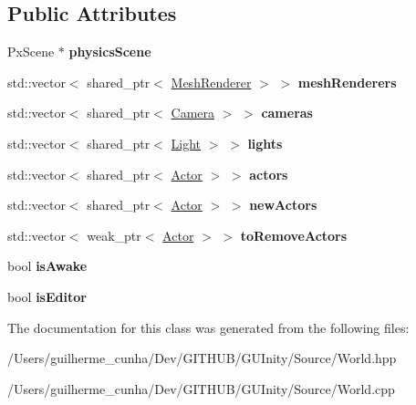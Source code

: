\subsection*{Public Attributes}
\begin{DoxyCompactItemize}
\item 
\hypertarget{class_world_a1cc1afd61b245eaa62eac90fdc629ee9}{}Px\+Scene $\ast$ {\bfseries physics\+Scene}\label{class_world_a1cc1afd61b245eaa62eac90fdc629ee9}

\item 
\hypertarget{class_world_aeb47e6e9190a33f623b63135045c339b}{}std\+::vector$<$ shared\+\_\+ptr$<$ \hyperlink{class_mesh_renderer}{Mesh\+Renderer} $>$ $>$ {\bfseries mesh\+Renderers}\label{class_world_aeb47e6e9190a33f623b63135045c339b}

\item 
\hypertarget{class_world_aff74fed56b77cb89f8a27f5dd8140f48}{}std\+::vector$<$ shared\+\_\+ptr$<$ \hyperlink{class_camera}{Camera} $>$ $>$ {\bfseries cameras}\label{class_world_aff74fed56b77cb89f8a27f5dd8140f48}

\item 
\hypertarget{class_world_a9cfccbc5ffd60f6d76e129f081274d31}{}std\+::vector$<$ shared\+\_\+ptr$<$ \hyperlink{class_light}{Light} $>$ $>$ {\bfseries lights}\label{class_world_a9cfccbc5ffd60f6d76e129f081274d31}

\item 
\hypertarget{class_world_aeeb78216c074d5af93306b3fefcab7f2}{}std\+::vector$<$ shared\+\_\+ptr$<$ \hyperlink{class_actor}{Actor} $>$ $>$ {\bfseries actors}\label{class_world_aeeb78216c074d5af93306b3fefcab7f2}

\item 
\hypertarget{class_world_a3a0f876c1f003e0fbfce30da0f18d730}{}std\+::vector$<$ shared\+\_\+ptr$<$ \hyperlink{class_actor}{Actor} $>$ $>$ {\bfseries new\+Actors}\label{class_world_a3a0f876c1f003e0fbfce30da0f18d730}

\item 
\hypertarget{class_world_a123122330f53df3868a97f5cef2f0704}{}std\+::vector$<$ weak\+\_\+ptr$<$ \hyperlink{class_actor}{Actor} $>$ $>$ {\bfseries to\+Remove\+Actors}\label{class_world_a123122330f53df3868a97f5cef2f0704}

\item 
\hypertarget{class_world_ad192f3af680a25132906f54f931766f5}{}bool {\bfseries is\+Awake}\label{class_world_ad192f3af680a25132906f54f931766f5}

\item 
\hypertarget{class_world_a9b29e4d9918c4eb24bc8f0fc940687eb}{}bool {\bfseries is\+Editor}\label{class_world_a9b29e4d9918c4eb24bc8f0fc940687eb}

\end{DoxyCompactItemize}


The documentation for this class was generated from the following files\+:\begin{DoxyCompactItemize}
\item 
/\+Users/guilherme\+\_\+cunha/\+Dev/\+G\+I\+T\+H\+U\+B/\+G\+U\+Inity/\+Source/World.\+hpp\item 
/\+Users/guilherme\+\_\+cunha/\+Dev/\+G\+I\+T\+H\+U\+B/\+G\+U\+Inity/\+Source/World.\+cpp\end{DoxyCompactItemize}

